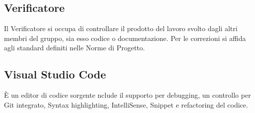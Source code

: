 \section{}
\subsection*{Verificatore} Il Verificatore si occupa di controllare il prodotto del lavoro svolto dagli altri membri del gruppo, sia esso codice o documentazione. Per le correzioni si affida agli standard definiti nelle Norme di Progetto.

\subsection*{Visual Studio Code} È un editor di codice sorgente nclude il supporto per debugging, un controllo per Git integrato, Syntax highlighting, IntelliSense, Snippet e refactoring del codice.
\newpage